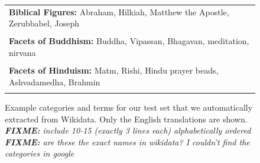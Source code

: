\documentclass[11pt,a4paper]{article}
\newcommand{\fixme}[1]{{\color{red}\itshape \textbf{FIXME:} {#1}}}
\begin{document}
\begin{figure}

\small
\itshape
    \begin{tabular}{p{}}
    \textbf{Biblical Figures:}
    Abraham,
    Hilkiah,
    Matthew the Apostle,
    Zerubbabel,
    Joseph
    \\
    \\[-4pt]

    \textbf{Facets of Buddhism:}
    Buddha,
    Vipassan,
    Bhagavan,
    meditation,
    nirvana
    \\
    \\[-4pt]

    \textbf{Facets of Hinduism:}
    Matm,
    Rishi,
    Hindu prayer beads,
    Ashvadamedha,
    Brahmin
    \\
    \\[-4pt]
\end{tabular}

\caption{
    Example categories and terms for our test set that we automatically extracted from Wikidata.
    Only the English translations are shown.
    \fixme{include 10-15 (exactly 3 lines each) alphabetically ordered}
    \fixme{are these the exact names in wikidata?  I couldn't find the categories in google}
}
\label{table:wikidata}
\end{figure}
\end{document}
